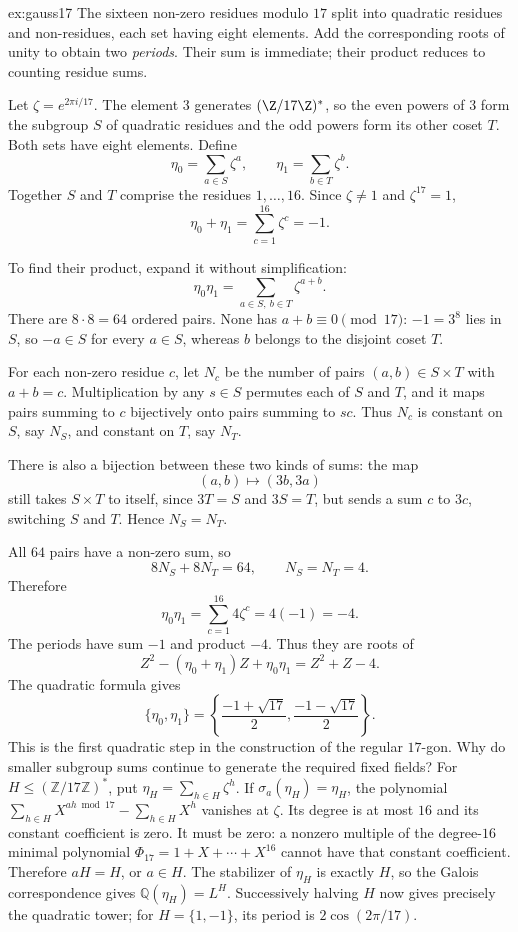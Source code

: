 \begin{solution}{ex:gauss17}
\idea The sixteen non-zero residues modulo $17$ split into quadratic residues and non-residues, each set having eight elements. Add the corresponding roots of unity to obtain two \emph{periods}. Their sum is immediate; their product reduces to counting residue sums.

\writeup Let $\zeta=e^{2\pi i/17}$. The element $3$ generates $(\Z/17\Z)^*$, so the even powers of $3$ form the subgroup $S$ of quadratic residues and the odd powers form its other coset $T$. Both sets have eight elements. Define
\[
\eta_0=\sum_{a\in S}\zeta^a,\qquad
\eta_1=\sum_{b\in T}\zeta^b.
\]
Together $S$ and $T$ comprise the residues $1,\ldots,16$. Since $\zeta\ne1$ and $\zeta^{17}=1$,
\[
\eta_0+\eta_1=\sum_{c=1}^{16}\zeta^c=-1.
\]

To find their product, expand it without simplification:
\[
\eta_0\eta_1=\sum_{a\in S,\ b\in T}\zeta^{a+b}.
\]
There are $8\cdot8=64$ ordered pairs. None has $a+b\equiv0\pmod{17}$: $-1=3^8$ lies in $S$, so $-a\in S$ for every $a\in S$, whereas $b$ belongs to the disjoint coset $T$.

For each non-zero residue $c$, let $N_c$ be the number of pairs $(a,b)\in S\times T$ with $a+b=c$. Multiplication by any $s\in S$ permutes each of $S$ and $T$, and it maps pairs summing to $c$ bijectively onto pairs summing to $sc$. Thus $N_c$ is constant on $S$, say $N_S$, and constant on $T$, say $N_T$.

There is also a bijection between these two kinds of sums: the map
\[
(a,b)\longmapsto(3b,3a)
\]
still takes $S\times T$ to itself, since $3T=S$ and $3S=T$, but sends a sum $c$ to $3c$, switching $S$ and $T$. Hence $N_S=N_T$.

All $64$ pairs have a non-zero sum, so
\[
8N_S+8N_T=64,
\qquad N_S=N_T=4.
\]
Therefore
\[
\eta_0\eta_1
=\sum_{c=1}^{16}4\zeta^c
=4(-1)=-4.
\]
The periods have sum $-1$ and product $-4$. Thus they are roots of
\[
Z^2-(\eta_0+\eta_1)Z+\eta_0\eta_1
=Z^2+Z-4.
\]
The quadratic formula gives
\[
\boxed{\{\eta_0,\eta_1\}
=\left\{\frac{-1+\sqrt{17}}2,\frac{-1-\sqrt{17}}2\right\}}.
\]
This is the first quadratic step in the construction of the regular $17$-gon.
Why do smaller subgroup sums continue to generate the required fixed fields?
For $H\le(\mathbb Z/17\mathbb Z)^*$, put $\eta_H=\sum_{h\in H}\zeta^h$.
If $\sigma_a(\eta_H)=\eta_H$, the polynomial
$\sum_{h\in H}X^{ah\bmod17}-\sum_{h\in H}X^h$ vanishes at $\zeta$.
Its degree is at most $16$ and its constant coefficient is zero. It must be
zero: a nonzero multiple of the degree-$16$ minimal polynomial
$\Phi_{17}=1+X+\cdots+X^{16}$ cannot have that constant coefficient.
Therefore $aH=H$, or $a\in H$. The stabilizer of $\eta_H$ is exactly $H$,
so the Galois correspondence gives $\mathbb Q(\eta_H)=L^H$.
Successively halving $H$ now gives precisely the quadratic tower; for
$H=\{1,-1\}$, its period is $2\cos(2\pi/17)$.
\end{solution}

